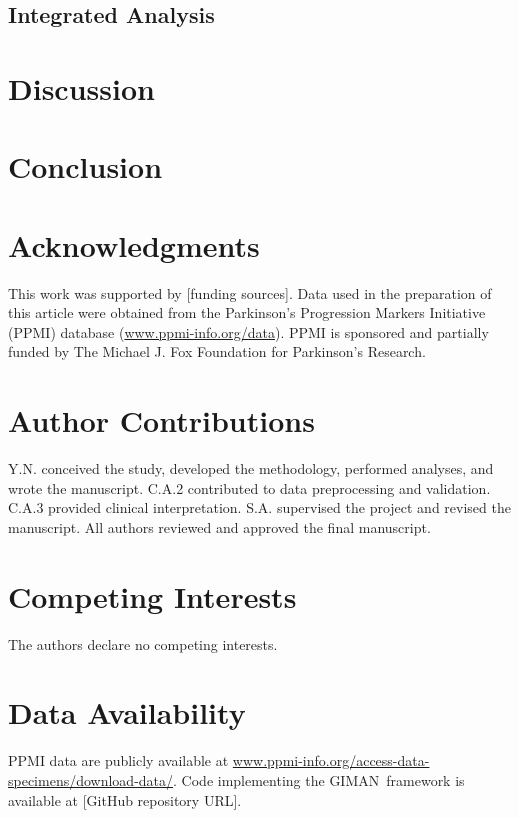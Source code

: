 \documentclass[9pt,twocolumn]{article}
\newcommand{\giman}{\textsc{GIMAN}}
\begin{document}
\subsection{Integrated Analysis}
\label{sec:results:integrated}


\section{Discussion}
\label{sec:discussion}


\section{Conclusion}
\label{sec:conclusion}


\section*{Acknowledgments}
This work was supported by [funding sources]. Data used in the preparation of this article were obtained from the Parkinson's Progression Markers Initiative (PPMI) database (\url{www.ppmi-info.org/data}). PPMI is sponsored and partially funded by The Michael J. Fox Foundation for Parkinson's Research.

\section*{Author Contributions}
Y.N. conceived the study, developed the methodology, performed analyses, and wrote the manuscript. C.A.2 contributed to data preprocessing and validation. C.A.3 provided clinical interpretation. S.A. supervised the project and revised the manuscript. All authors reviewed and approved the final manuscript.

\section*{Competing Interests}
The authors declare no competing interests.

\section*{Data Availability}
PPMI data are publicly available at \url{www.ppmi-info.org/access-data-specimens/download-data/}. Code implementing the \giman\ framework is available at [GitHub repository URL].
\end{document}
